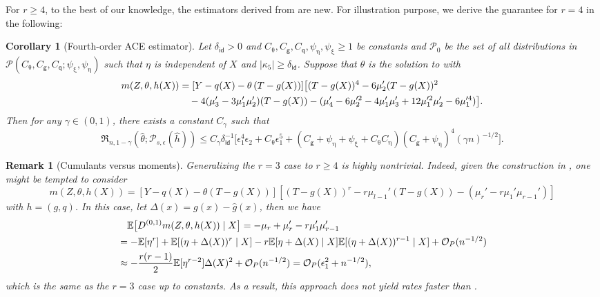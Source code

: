 \documentclass{article}
\def\eps{{\epsilon}}
\def\gO{{\mathcal{O}}}
\def\gP{{\mathcal{P}}}
\newcommand{\E}{\mathbb{E}}
\newtheorem{remark}{Remark}[section]
\newtheorem{corollary}{Corollary}[section]
\begin{document}
For $r\geq 4$, to the best of our knowledge, the estimators derived from  are new. For illustration purpose, we derive the guarantee for $r=4$ in the following:

\begin{corollary}[Fourth-order ACE estimator]
    \label{cor:fourth-order-structure-agnostic}
    Let $\delta_{\mathsf{id}}>0$ and $C_{\uptheta}, C_{\mathsf{g}}, C_{\mathsf{q}}, \psi_{\upeta}, \psi_{\upxi} \geq 1$ be constants and $\gP_0$ be the set of all distributions in $\gP(C_{\uptheta}, C_{\mathsf{g}}, C_{\mathsf{q}}; \psi_{\upxi}, \psi_{\upeta})$ such that $\eta$ is independent of $X$ and $|\kappa_5|\geq \delta_{\mathsf{id}}$. Suppose that $\theta$ is the solution to  with 
    \begin{equation}
        \notag
        \begin{aligned}
            m(Z,\theta,h(X)) &= [Y-q(X)-\theta\left(T-g(X)\right)]\big[ (T-g(X))^4 - 6\mu_2'(T-g(X))^2 \\
            &\quad - 4(\mu_3'-3\mu_1'\mu_2')(T-g(X)) - (\mu_4'-6\mu_2'^2-4\mu_1'\mu_3'+12\mu_1'^2\mu_2'-6\mu_1'^4) \big].
        \end{aligned}
    \end{equation}
    Then for any $\gamma\in(0,1)$, there exists a constant $C_{\gamma}$ such that
    $$\mathfrak{R}_{n,1-\gamma} (\hat{\theta};\gP_{s,\eps}(\hat{h})) \leq C_{\gamma}\delta_{\mathsf{id}}^{-1}\big[ \eps_1^4\eps_2 + C_{\uptheta} \eps_1^5 + (C_{\mathsf{g}}+\psi_{\upeta}+\psi_{\upxi}+C_{\uptheta}C_{\upeta}) (C_{\mathsf{g}}+\psi_{\upeta})^4 (\gamma n)^{-1/2} \big].$$
\end{corollary}

\begin{remark}[Cumulants versus moments]
Generalizing the $r=3$ case to $r\geq 4$ is highly nontrivial. Indeed, given the construction in , one might be tempted to consider $$m(Z,\theta,h(X)) = \left[Y-q(X)-\theta\left(T-g(X)\right)\right]\left[ (T-g(X))^r - r\mu_{l-1}'(T-g(X)) - (\mu_r'-r\mu_1'\mu_{r-1}') \right]$$ with $h=(g,q)$. In this case, let $\Delta(x) = g(x)-\hat{g}(x)$, then we have
\begin{equation}
    \notag
    \begin{aligned}
        &\quad \E\big[D^{(0,1)} m(Z,\theta,h(X))\mid X\big] = - \mu_r + \mu_r' - r\mu_1'\mu_{r-1}' \\
        &= - \E[\eta^r] + \E[(\eta+\Delta(X))^r\mid X] - r\E[\eta+\Delta(X)\mid X]\E[(\eta+\Delta(X))^{r-1}\mid X] + \gO_P(n^{-1/2}) \\
        &\approx -\frac{r(r-1)}{2}\E[\eta^{r-2}]\Delta(X)^2 + \gO_P(n^{-1/2}) = \gO_P(\eps_1^2 + n^{-1/2}),
    \end{aligned}
\end{equation}
which is the same as the $r=3$ case up to constants. As a result, this approach does not yield rates faster than .
\end{remark}
\end{document}
